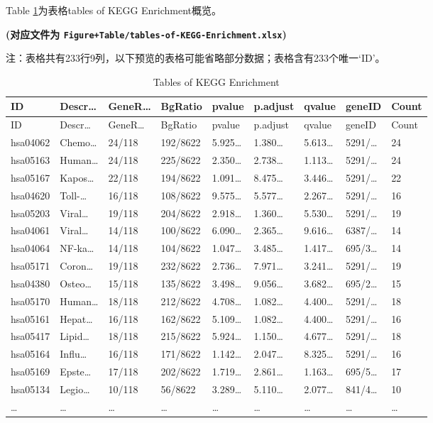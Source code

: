 \documentclass[
]{article}
\begin{document}
Table \ref{tab:tables-of-KEGG-Enrichment}为表格tables of KEGG Enrichment概览。

\textbf{(对应文件为 \texttt{Figure+Table/tables-of-KEGG-Enrichment.xlsx})}

\begin{center}\begin{tcolorbox}[colback=gray!10, colframe=gray!50, width=0.9\linewidth, arc=1mm, boxrule=0.5pt]注：表格共有233行9列，以下预览的表格可能省略部分数据；表格含有233个唯一`ID'。
\end{tcolorbox}
\end{center}

\begin{longtable}[]{@{}lllllllll@{}}
\caption{\label{tab:tables-of-KEGG-Enrichment}Tables of KEGG Enrichment}\tabularnewline
\toprule
ID & Descr\ldots{} & GeneR\ldots{} & BgRatio & pvalue & p.adjust & qvalue & geneID & Count\tabularnewline
\midrule
\endfirsthead
\toprule
ID & Descr\ldots{} & GeneR\ldots{} & BgRatio & pvalue & p.adjust & qvalue & geneID & Count\tabularnewline
\midrule
\endhead
hsa04062 & Chemo\ldots{} & 24/118 & 192/8622 & 5.925\ldots{} & 1.380\ldots{} & 5.613\ldots{} & 5291/\ldots{} & 24\tabularnewline
hsa05163 & Human\ldots{} & 24/118 & 225/8622 & 2.350\ldots{} & 2.738\ldots{} & 1.113\ldots{} & 5291/\ldots{} & 24\tabularnewline
hsa05167 & Kapos\ldots{} & 22/118 & 194/8622 & 1.091\ldots{} & 8.475\ldots{} & 3.446\ldots{} & 5291/\ldots{} & 22\tabularnewline
hsa04620 & Toll-\ldots{} & 16/118 & 108/8622 & 9.575\ldots{} & 5.577\ldots{} & 2.267\ldots{} & 5291/\ldots{} & 16\tabularnewline
hsa05203 & Viral\ldots{} & 19/118 & 204/8622 & 2.918\ldots{} & 1.360\ldots{} & 5.530\ldots{} & 5291/\ldots{} & 19\tabularnewline
hsa04061 & Viral\ldots{} & 14/118 & 100/8622 & 6.090\ldots{} & 2.365\ldots{} & 9.616\ldots{} & 6387/\ldots{} & 14\tabularnewline
hsa04064 & NF-ka\ldots{} & 14/118 & 104/8622 & 1.047\ldots{} & 3.485\ldots{} & 1.417\ldots{} & 695/3\ldots{} & 14\tabularnewline
hsa05171 & Coron\ldots{} & 19/118 & 232/8622 & 2.736\ldots{} & 7.971\ldots{} & 3.241\ldots{} & 5291/\ldots{} & 19\tabularnewline
hsa04380 & Osteo\ldots{} & 15/118 & 135/8622 & 3.498\ldots{} & 9.056\ldots{} & 3.682\ldots{} & 695/2\ldots{} & 15\tabularnewline
hsa05170 & Human\ldots{} & 18/118 & 212/8622 & 4.708\ldots{} & 1.082\ldots{} & 4.400\ldots{} & 5291/\ldots{} & 18\tabularnewline
hsa05161 & Hepat\ldots{} & 16/118 & 162/8622 & 5.109\ldots{} & 1.082\ldots{} & 4.400\ldots{} & 5291/\ldots{} & 16\tabularnewline
hsa05417 & Lipid\ldots{} & 18/118 & 215/8622 & 5.924\ldots{} & 1.150\ldots{} & 4.677\ldots{} & 5291/\ldots{} & 18\tabularnewline
hsa05164 & Influ\ldots{} & 16/118 & 171/8622 & 1.142\ldots{} & 2.047\ldots{} & 8.325\ldots{} & 5291/\ldots{} & 16\tabularnewline
hsa05169 & Epste\ldots{} & 17/118 & 202/8622 & 1.719\ldots{} & 2.861\ldots{} & 1.163\ldots{} & 695/5\ldots{} & 17\tabularnewline
hsa05134 & Legio\ldots{} & 10/118 & 56/8622 & 3.289\ldots{} & 5.110\ldots{} & 2.077\ldots{} & 841/4\ldots{} & 10\tabularnewline
\ldots{} & \ldots{} & \ldots{} & \ldots{} & \ldots{} & \ldots{} & \ldots{} & \ldots{} & \ldots{}\tabularnewline
\bottomrule
\end{longtable}
\end{document}
